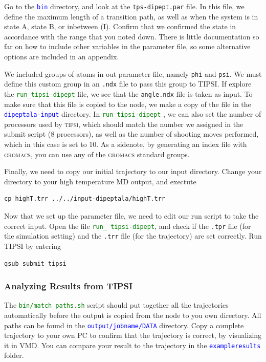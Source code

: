 \documentclass[]{article}
\begin{document}
Go to the \textcolor{blue}{\texttt{bin}} directory, and look at the \texttt{tps-dipept.par} file. In this file, we define the maximum length of a transition path, as well as when the system is in state A, state B, or inbetween (I). Confirm that we confirmed the state in accordance with the range that you noted down. There is little documentation so far on how to include other variables in the parameter file, so some alternative options are included in an appendix.

We included groups of atoms in out parameter file, namely \texttt{phi} and \texttt{psi}. We must define this custom group in an \texttt{.ndx} file to pass this group to TIPSI. If explore the \textcolor{green}{\texttt{run\_tipsi-dipept}} file, we see that the \texttt{angle.ndx} file is taken as input. To make sure that this file is copied to the node, we make a copy of the file in the \textcolor{blue}{\texttt{dipeptala-input}} directory. In \textcolor{green}{\texttt{run\_tipsi-dipept}} , we can also set the number of processors used by \textsc{tipsi}, which should match the number we assigned in the submit script (8 processors), as well as the number of shooting moves performed, which in this case is set to 10. As a sidenote, by generating an index file with \textsc{gromacs}, you can use any of the \textsc{gromacs} standard groups. 

Finally, we need to copy our initial trajectory to our input directory. Change your directory to your high temperature MD output, and exectute 
%
\begin{lstlisting}
cp highT.trr ../../input-dipeptala/highT.trr
\end{lstlisting}
%

Now that we set up the parameter file, we need to edit our run script to take the correct input. Open the file \textcolor{green}{\texttt{run\_ tipsi-dipept}}, and check if the \texttt{.tpr} file (for the simulation setting) and the \texttt{.trr} file (for the trajectory) are set correctly. Run \textsc{TIPSI} by entering
%
\begin{lstlisting}
qsub submit_tipsi
\end{lstlisting}
%

\subsubsection*{Analyzing Results from TIPSI}

The \textcolor{green}{\texttt{bin/match\_paths.sh}} script should put together all the trajectories automatically before the output is copied from the node to you own directory. All paths can be found in the \textcolor{blue}{\texttt{output/jobname/DATA}} directory. Copy a complete trajectory to your own PC to confirm that the trajectory is correct, by visualizing it in \textsc{VMD}. You can compare your result to the trajectory in the \textcolor{blue}{\texttt{exampleresults}} folder.
\end{document}
